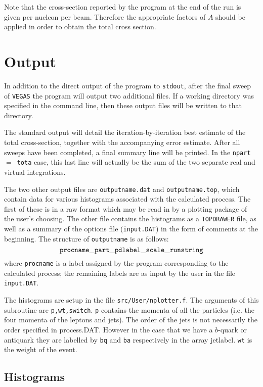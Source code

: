 \documentclass[12pt]{article}
\begin{document}
Note that the cross-section reported by the program at the end
of the run is given per nucleon per beam. Therefore the
appropriate factors of $A$ should be applied in order to obtain
the total cross section.

\section{Output}
 
In addition to the direct output of the program to {\tt stdout}, after
the final sweep of {\tt VEGAS} the program will output two additional files.
If a working directory was specified in the command line, then these
output files will be written to that directory.

The standard output will detail the iteration-by-iteration best estimate
of the total cross-section, together with the accompanying error estimate.
After all sweeps have been completed, a final summary line will be printed.
In the {\tt npart}~$=$~{\tt tota} case, this last line will actually be the
sum of the two separate real and virtual integrations.

The two other output files are {\tt outputname.dat} and
{\tt outputname.top}, which contain data for various histograms associated
with the calculated process. The first of these is in a raw format 
which may be read in by a plotting package of the user's choosing. The
other file contains the histograms as a {\tt TOPDRAWER} file, as well
as a summary of the options file ({\tt input.DAT}) in the form of
comments at the beginning. The structure
of {\tt outputname} is as follows:
\begin{displaymath}
{\tt procname\_part\_pdlabel\_scale\_runstring}
\end{displaymath}
where {\tt procname} is a label assigned by the program corresponding to
the calculated process; the remaining labels are as input by the user
in the file {\tt input.DAT}.

The histograms are  setup in the file {\tt src/User/nplotter.f}. The arguments of this
subroutine are { \tt p,wt,switch}. {\tt p} contains the momenta of all the particles
(i.e. the four momenta of the leptons and jets). The order of the jets is not
necessarily the  order specified in process.DAT.  However in the case that we have a 
$b$-quark or antiquark they are labelled by {\tt bq} and {\tt ba} respectively
in the array jetlabel. {\tt wt} is the weight of the event.  

\subsection{Histograms}
\label{sec:histos}
\end{document}
